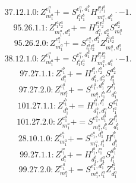\documentclass[letterpaper,10pt,fleqn,leqno,onecolumn]{article}
\begin{document}
\begin{equation} \;\;\;\;\;\;  37.12.1.0: Z^{e_{1}^{a}}_{m_{1}^{a}}+=S^{e_{1}^{a},d_{1}^{b}}_{l_{1}^{a}l_{1}^{b}}H^{l_{1}^{a}l_{1}^{b}}_{m_{1}^{a},d_{1}^{b}}\cdot -1. \end{equation}
\begin{equation} \;\;\;\;\;\;  95.26.1.1: Z^{l_{1}^{a}l_{2}^{a}}_{m_{1}^{a},d_{1}^{a}}+=H^{l_{1}^{a}l_{2}^{a}}_{d_{1}^{a},d_{2}^{a}}S^{d_{2}^{a}}_{m_{1}^{a}} \end{equation}
\begin{equation} \;\;\;\;\;\;  95.26.2.0: Z^{e_{1}^{a}}_{m_{1}^{a}}+=S^{e_{1}^{a},d_{1}^{a}}_{l_{1}^{a}l_{2}^{a}}Z^{l_{1}^{a}l_{2}^{a}}_{m_{1}^{a},d_{1}^{a}} \end{equation}
\begin{equation} \;\;\;\;\;\;  38.12.1.0: Z^{e_{1}^{a}}_{m_{1}^{a}}+=S^{e_{1}^{a},d_{1}^{a}}_{l_{1}^{a}l_{2}^{a}}H^{l_{1}^{a}l_{2}^{a}}_{m_{1}^{a},d_{1}^{a}}\cdot -1. \end{equation}
\begin{equation} \;\;\;\;\;\;  97.27.1.1: Z^{l_{1}^{b}}_{d_{1}^{b}}+=H^{l_{1}^{b},l_{2}^{b}}_{d_{1}^{b},d_{2}^{b}}S^{d_{2}^{b}}_{l_{2}^{b}} \end{equation}
\begin{equation} \;\;\;\;\;\;  97.27.2.0: Z^{e_{1}^{a}}_{m_{1}^{a}}+=S^{e_{1}^{a},d_{1}^{b}}_{m_{1}^{a},l_{1}^{b}}Z^{l_{1}^{b}}_{d_{1}^{b}} \end{equation}
\begin{equation} \;\;\;\;\;\;  101.27.1.1: Z^{l_{1}^{b}}_{d_{1}^{b}}+=H^{l_{1}^{b},l_{1}^{a}}_{d_{1}^{b},d_{1}^{a}}S^{d_{1}^{a}}_{l_{1}^{a}} \end{equation}
\begin{equation} \;\;\;\;\;\;  101.27.2.0: Z^{e_{1}^{a}}_{m_{1}^{a}}+=S^{e_{1}^{a},d_{1}^{b}}_{m_{1}^{a},l_{1}^{b}}Z^{l_{1}^{b}}_{d_{1}^{b}} \end{equation}
\begin{equation} \;\;\;\;\;\;  28.10.1.0: Z^{e_{1}^{a}}_{m_{1}^{a}}+=S^{e_{1}^{a},d_{1}^{b}}_{m_{1}^{a},l_{1}^{b}}H^{l_{1}^{b}}_{d_{1}^{b}} \end{equation}
\begin{equation} \;\;\;\;\;\;  99.27.1.1: Z^{l_{1}^{a}}_{d_{1}^{a}}+=H^{l_{1}^{b},l_{1}^{a}}_{d_{1}^{b},d_{1}^{a}}S^{d_{1}^{b}}_{l_{1}^{b}} \end{equation}
\begin{equation} \;\;\;\;\;\;  99.27.2.0: Z^{e_{1}^{a}}_{m_{1}^{a}}+=S^{e_{1}^{a},d_{1}^{a}}_{m_{1}^{a},l_{1}^{a}}Z^{l_{1}^{a}}_{d_{1}^{a}} \end{equation}
\end{document}
